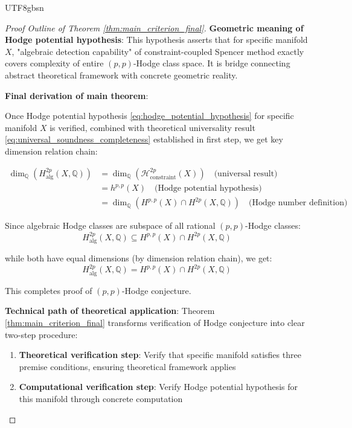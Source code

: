 \documentclass[a4paper,12pt]{extarticle}
\theoremstyle{definition}
\begin{document}
\begin{CJK}{UTF8}{gbsn}
\begin{proof}[Proof Outline of Theorem \ref{thm:main_criterion_final}]
\textbf{Geometric meaning of Hodge potential hypothesis}: This hypothesis asserts that for specific manifold $X$, "algebraic detection capability" of constraint-coupled Spencer method exactly covers complexity of entire $(p,p)$-Hodge class space. It is bridge connecting abstract theoretical framework with concrete geometric reality.

\textbf{Final derivation of main theorem}:

Once Hodge potential hypothesis \eqref{eq:hodge_potential_hypothesis} for specific manifold $X$ is verified, combined with theoretical universality result \eqref{eq:universal_soundness_completeness} established in first step, we get key dimension relation chain:

\begin{align}
\dim_{\mathbb{Q}}(H_{\text{alg}}^{2p}(X, \mathbb{Q})) &= \dim_{\mathbb{Q}}(\mathcal{H}_{\text{constraint}}^{2p}(X)) \quad \text{(universal result)}\label{eq:dimension_chain_1}\\
&= h^{p,p}(X) \quad \text{(Hodge potential hypothesis)}\label{eq:dimension_chain_2}\\
&= \dim_{\mathbb{Q}}(H^{p,p}(X) \cap H^{2p}(X, \mathbb{Q})) \quad \text{(Hodge number definition)}\label{eq:dimension_chain_3}
\end{align}

Since algebraic Hodge classes are subspace of all rational $(p,p)$-Hodge classes:
$$H_{\text{alg}}^{2p}(X, \mathbb{Q}) \subseteq H^{p,p}(X) \cap H^{2p}(X, \mathbb{Q})$$

while both have equal dimensions (by dimension relation chain), we get:
\begin{equation}
\label{eq:hodge_conjecture_conclusion_derived}
H_{\text{alg}}^{2p}(X, \mathbb{Q}) = H^{p,p}(X) \cap H^{2p}(X, \mathbb{Q})
\end{equation}

This completes proof of $(p,p)$-Hodge conjecture.

\textbf{Technical path of theoretical application}: Theorem \ref{thm:main_criterion_final} transforms verification of Hodge conjecture into clear two-step procedure:
\begin{enumerate}
    \item \textbf{Theoretical verification step}: Verify that specific manifold satisfies three premise conditions, ensuring theoretical framework applies
    \item \textbf{Computational verification step}: Verify Hodge potential hypothesis for this manifold through concrete computation
\end{enumerate}


\end{proof}
\end{CJK}
\end{document}
